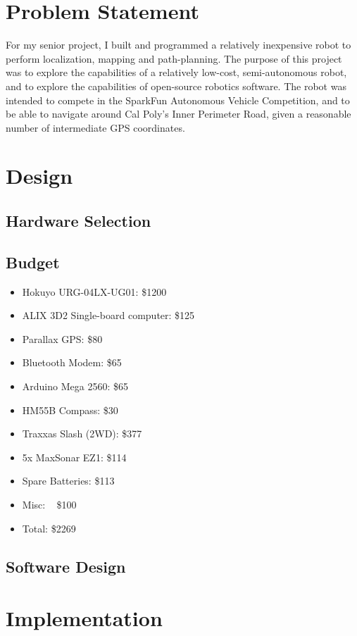 \documentclass[a4paper,12pt]{article}
\begin{document}
\section{Problem Statement}
For my senior project, I built and programmed a relatively inexpensive robot to perform localization, mapping and path-planning. The purpose of this project was to explore the capabilities of a relatively low-cost, semi-autonomous robot, and to explore the capabilities of open-source robotics software. The robot was intended to compete in the SparkFun Autonomous Vehicle Competition\cite{avc}, and to be able to navigate around Cal Poly's Inner Perimeter Road, given a reasonable number of intermediate GPS coordinates.

\section{Design}
\subsection{Hardware Selection}


\subsection{Budget}
\begin{itemize}
\item Hokuyo URG-04LX-UG01: \$1200
\item ALIX 3D2 Single-board computer: \$125
\item Parallax GPS: \$80
\item Bluetooth Modem: \$65
\item Arduino Mega 2560: \$65
\item HM55B Compass: \$30
\item Traxxas Slash (2WD): \$377
\item 5x MaxSonar EZ1: \$114
\item Spare Batteries: \$113
\item Misc: ~ \$100
\item Total: \$2269
\end{itemize}

\subsection{Software Design}


\section{Implementation}
\end{document}
